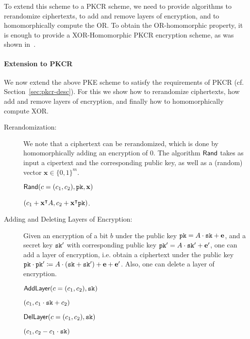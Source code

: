 To extend this scheme to a PKCR scheme, we need to provide algorithms to rerandomize ciphertexts, to add and remove layers of encryption, and to homomorphically compute the OR. To obtain the OR-homomorphic property, it is enough to provide a XOR-Homomorphic PKCR encryption scheme, as was shown in~\cite{EPRINT:AkaLaVMor17}.

\paragraph{Extension to PKCR} 
We now extend the above PKE scheme to satisfy the requirements of PKCR (cf. Section~\ref{sec:pkcr-desc}). 
For this we show how to rerandomize ciphertexts, how add and remove layers of encryption, and finally how to homomorphically compute XOR.

\begin{description}
	
	\item[Rerandomization:] We note that a ciphertext can be rerandomized, which is done by homomorphically adding an encryption of $0$. The algorithm $\textsf{Rand}$ takes as input a cipertext and the corresponding public key, as well as a (random) vector $\mathbf{x} \in \{0,1\}^{m}$.
	
	\begin{algobox}{$\textsf{Rand}(c = (c_1,c_2),\texttt{pk},\mathbf{x})$}
		\begin{algorithmic}
			\State \Return $(c_1 + \mathbf{x}^{\intercal} A,c_2 + \mathbf{x}^{\intercal}\texttt{pk})$.
		\end{algorithmic}
	\end{algobox}
	
	\item[Adding and Deleting Layers of Encryption:] Given an encryption of a bit $b$ under the public key $\texttt{pk} = A\cdot \texttt{sk} + \mathbf{e}$, and a secret key $\texttt{sk}'$ with corresponding public key $\texttt{pk}' = A \cdot \texttt{sk}' + \mathbf{e}'$, one can add a layer of encryption, i.e. obtain a ciphertext under the public key $\texttt{pk} \cdot \texttt{pk}' \coloneqq A \cdot (\texttt{sk} + \texttt{sk}') + \mathbf{e} + \mathbf{e}'$. Also, one can delete a layer of encryption.
	
	\begin{algobox}{$\textsf{AddLayer}(c = (c_1,c_2),\texttt{sk})$}
		\begin{algorithmic}
			\State \Return $(c_1,c_1\cdot \texttt{sk} + c_2)$
		\end{algorithmic}
	\end{algobox}
	
	\begin{algobox}{$\textsf{DelLayer}(c = (c_1,c_2),\texttt{sk})$}
		\begin{algorithmic}
			\State \Return $(c_1,c_2 - c_1\cdot \texttt{sk})$
		\end{algorithmic}
	\end{algobox}
	

\end{description}
